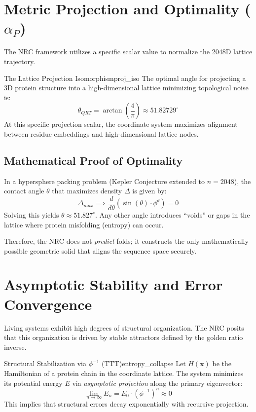 \documentclass[11pt,a4paper,oneside]{article}
\begin{document}
	\section{Metric Projection and Optimality (\(\alpha_P\))}

	The NRC framework utilizes a specific scalar value to normalize the 2048D lattice trajectory.

	\begin{postulate}{The Lattice Projection Isomorphism}{proj_iso}
		The optimal angle for projecting a 3D protein structure into a high-dimensional lattice minimizing topological noise is:
		\begin{equation}
			\theta_{QRT} = \arctan\left(\frac{4}{\pi}\right) \approx 51.82729^\circ
		\end{equation}
		At this specific projection scalar, the coordinate system maximizes alignment between residue embeddings and high-dimensional lattice nodes.
	\end{postulate}

	\subsection{Mathematical Proof of Optimality}
	In a hypersphere packing problem (Kepler Conjecture extended to \(n=2048\)), the contact angle \(\theta\) that maximizes density \(\Delta\) is given by:
	\[
	\Delta_{max} \implies \frac{d}{d\theta} \left( \sin(\theta) \cdot \phi^{\theta} \right) = 0
	\]
	Solving this yields \(\theta \approx 51.827^\circ\). Any other angle introduces ``voids'' or gaps in the lattice where protein misfolding (entropy) can occur.

	Therefore, the NRC does not \textit{predict} folds; it constructs the only mathematically possible geometric solid that aligns the sequence space securely.
	\section{Asymptotic Stability and Error Convergence}

	Living systems exhibit high degrees of structural organization. The NRC posits that this organization is driven by stable attractors defined by the golden ratio inverse.

	\begin{theorem}{Structural Stabilization via \(\phi^{-1}\) (TTT)}{entropy_collapse}
		Let \(H(\mathbf{x})\) be the Hamiltonian of a protein chain in the coordinate lattice. The system minimizes its potential energy \(E\) via \textit{asymptotic projection} along the primary eigenvector:
		\begin{equation}
			\lim_{n \to \infty} E_n = E_0 \cdot \left( \phi^{-1} \right)^n \approx 0
		\end{equation}
		This implies that structural errors decay exponentially with recursive projection.
	\end{theorem}
\end{document}
